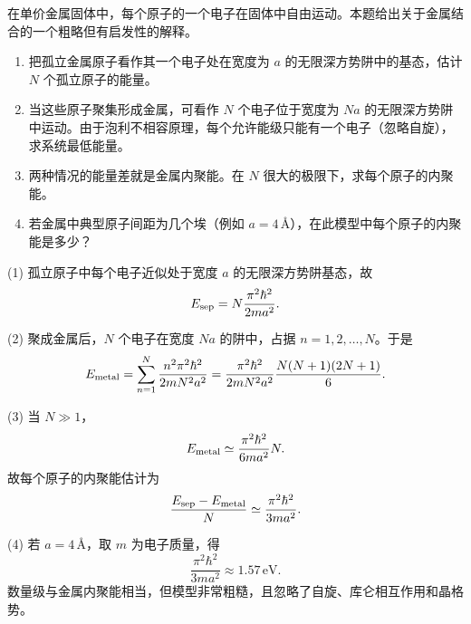 \begin{question}
在单价金属固体中，每个原子的一个电子在固体中自由运动。本题给出关于金属结合的一个粗略但有启发性的解释。
\begin{enumerate}
\item 把孤立金属原子看作其一个电子处在宽度为 $a$ 的无限深方势阱中的基态，估计 $N$ 个孤立原子的能量。
\item 当这些原子聚集形成金属，可看作 $N$ 个电子位于宽度为 $Na$ 的无限深方势阱中运动。由于泡利不相容原理，每个允许能级只能有一个电子（忽略自旋），求系统最低能量。
\item 两种情况的能量差就是金属内聚能。在 $N$ 很大的极限下，求每个原子的内聚能。
\item 若金属中典型原子间距为几个埃（例如 $a=4\,\text{\AA}$），在此模型中每个原子的内聚能是多少？
\end{enumerate}
\end{question}
\begin{solution}
(1) 孤立原子中每个电子近似处于宽度 $a$ 的无限深方势阱基态，故
\[
E_{\rm sep}=N\frac{\pi^2\hbar^2}{2ma^2}.
\]

(2) 聚成金属后，$N$ 个电子在宽度 $Na$ 的阱中，占据 $n=1,2,\ldots,N$。于是
\[
E_{\rm metal}=\sum_{n=1}^N\frac{n^2\pi^2\hbar^2}{2mN^2a^2}
=\frac{\pi^2\hbar^2}{2mN^2a^2}\frac{N(N+1)(2N+1)}6.
\]

(3) 当 $N\gg1$，
\[
E_{\rm metal}\simeq \frac{\pi^2\hbar^2}{6ma^2}N.
\]
故每个原子的内聚能估计为
\[
\frac{E_{\rm sep}-E_{\rm metal}}{N}
\simeq \frac{\pi^2\hbar^2}{3ma^2}.
\]

(4) 若 $a=4\,\text{\AA}$，取 $m$ 为电子质量，得
\[
\frac{\pi^2\hbar^2}{3ma^2}\approx 1.57\,\mathrm{eV}.
\]
数量级与金属内聚能相当，但模型非常粗糙，且忽略了自旋、库仑相互作用和晶格势。
\end{solution}

